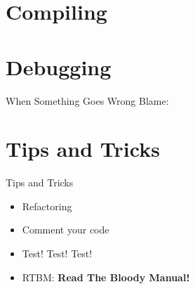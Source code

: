 \documentclass[main.tex]{subfiles}
\begin{document}
\section{Compiling} 
\label{sec:compiling}


\section{Debugging} 
\label{sec:debugging}

\begin{frame}{When Something Goes Wrong Blame:}

	\begin{itemize}
	\end{itemize}

\end{frame}


\section{Tips and Tricks} 
\label{sec:tips_and_tricks}

\begin{frame}{Tips and Tricks}
	\begin{itemize}
		\item Refactoring
		\item Comment your code
		\item Test! Test! Test!
		\item RTBM: \textbf{Read The Bloody Manual!}
	\end{itemize}
\end{frame}
\end{document}
